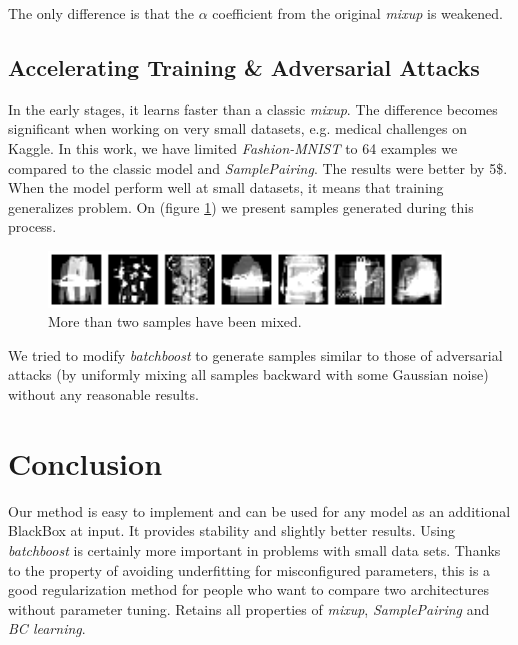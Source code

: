 \documentclass{article}
\begin{document}
The only difference is that the $\alpha$ coefficient from the original
\emph{mixup} is weakened.

\subsection{Accelerating Training \& Adversarial Attacks}
\label{sec:attacks}

In the early stages, it learns faster than a classic \emph{mixup}.
The difference becomes significant when working on very small datasets, e.g.
medical challenges on Kaggle. In this work, we have limited \emph{Fashion-MNIST}
to 64 examples we compared to the classic model and \emph{SamplePairing}. The results were better by 5\$.
When the model perform well at small datasets, it means that training
generalizes problem. On (figure \ref{fig:multipass}) we present samples
generated during this process.

\begin{figure}[H]
  \centering
  \includegraphics[width=10.5cm]{figure-multipass}
  \caption{More than two samples have been mixed.}
  \label{fig:multipass}
\end{figure}

We tried to modify \emph{batchboost} to generate samples similar to those of
adversarial attacks (by uniformly mixing all samples backward with some Gaussian
noise) without any reasonable results.

\section{Conclusion}
\label{sec:conclusion}

Our method is easy to implement and can be used for any
model as an additional BlackBox at input.
It provides stability and slightly better results.
Using \emph{batchboost} is certainly more important in problems with small data sets.
Thanks to the property of avoiding underfitting for misconfigured parameters,
this is a good regularization method for people who want to compare two
architectures without parameter tuning.
Retains all properties of \emph{mixup}, \emph{SamplePairing} and \emph{BC learning}.



\end{document}
